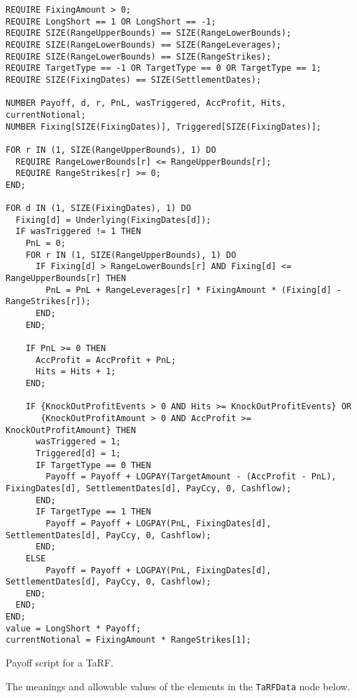 \begin{listing}[hbt]
\begin{verbatim}
REQUIRE FixingAmount > 0;
REQUIRE LongShort == 1 OR LongShort == -1;
REQUIRE SIZE(RangeUpperBounds) == SIZE(RangeLowerBounds);
REQUIRE SIZE(RangeLowerBounds) == SIZE(RangeLeverages);
REQUIRE SIZE(RangeLowerBounds) == SIZE(RangeStrikes);
REQUIRE TargetType == -1 OR TargetType == 0 OR TargetType == 1;
REQUIRE SIZE(FixingDates) == SIZE(SettlementDates);

NUMBER Payoff, d, r, PnL, wasTriggered, AccProfit, Hits, currentNotional;
NUMBER Fixing[SIZE(FixingDates)], Triggered[SIZE(FixingDates)];

FOR r IN (1, SIZE(RangeUpperBounds), 1) DO
  REQUIRE RangeLowerBounds[r] <= RangeUpperBounds[r];
  REQUIRE RangeStrikes[r] >= 0;
END;

FOR d IN (1, SIZE(FixingDates), 1) DO
  Fixing[d] = Underlying(FixingDates[d]);
  IF wasTriggered != 1 THEN
    PnL = 0;
    FOR r IN (1, SIZE(RangeUpperBounds), 1) DO
      IF Fixing[d] > RangeLowerBounds[r] AND Fixing[d] <= RangeUpperBounds[r] THEN
        PnL = PnL + RangeLeverages[r] * FixingAmount * (Fixing[d] - RangeStrikes[r]);
      END;
    END;

    IF PnL >= 0 THEN
      AccProfit = AccProfit + PnL;
      Hits = Hits + 1;
    END;

    IF {KnockOutProfitEvents > 0 AND Hits >= KnockOutProfitEvents} OR
       {KnockOutProfitAmount > 0 AND AccProfit >= KnockOutProfitAmount} THEN
      wasTriggered = 1;
      Triggered[d] = 1;
      IF TargetType == 0 THEN
        Payoff = Payoff + LOGPAY(TargetAmount - (AccProfit - PnL), FixingDates[d], SettlementDates[d], PayCcy, 0, Cashflow);
      END;
      IF TargetType == 1 THEN
        Payoff = Payoff + LOGPAY(PnL, FixingDates[d], SettlementDates[d], PayCcy, 0, Cashflow);
      END;
    ELSE
        Payoff = Payoff + LOGPAY(PnL, FixingDates[d], SettlementDates[d], PayCcy, 0, Cashflow);
    END;
  END;
END;
value = LongShort * Payoff;
currentNotional = FixingAmount * RangeStrikes[1];
\end{verbatim}
\caption{Payoff script for a TaRF.}
\label{lst:tarf_script}
\end{listing}

The meanings and allowable values of the elements in the \lstinline!TaRFData! node below.

